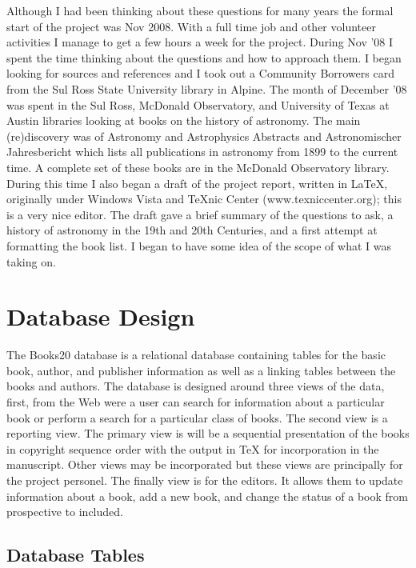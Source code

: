 \documentclass{article}%
\begin{document}
Although I had been thinking about these questions for many years the
formal start of the project was Nov 2008. With a full time job and
other volunteer activities I manage to get a few hours a week for the
project. During Nov '08 I spent the time thinking about the questions
and how to approach them.  I began looking for sources and references
and I took out a Community Borrowers card from the Sul Ross State
University library in Alpine.  The month of December '08 was spent in
the Sul Ross, McDonald Observatory, and University of Texas at Austin
libraries looking at books on the history of astronomy. The main
(re)discovery was of Astronomy and Astrophysics Abstracts and
Astronomischer Jahresbericht which lists all publications in astronomy
from 1899 to the current time. A complete set of these books are in
the McDonald Observatory library. During this time I also began a
draft of the project report, written in LaTeX, originally under
Windows Vista and TeXnic Center (www.texniccenter.org); this is a very
nice editor.  The draft gave a brief summary of the questions to ask,
a history of astronomy in the 19th and 20th Centuries, and a first
attempt at formatting the book list.  I began to have some idea of the
scope of what I was taking on.


%
%
\section{Database Design}

The Books20 database is a relational database containing tables for
the basic book, author, and publisher information as well as a linking
tables between the books and authors.  The database is designed around
three views of the data, first, from the Web were a user can search
for information about a particular book or perform a search for a
particular class of books.  The second view is a reporting view. The
primary view is will be a sequential presentation of the books in
copyright sequence order with the output in TeX for incorporation in
the manuscript. Other views may be incorporated but these views are
principally for the project personel. The finally view is for the
editors.  It allows them to update information about a book, add a new
book, and change the status of a book from prospective to included.

\subsection{Database Tables}
\end{document}

